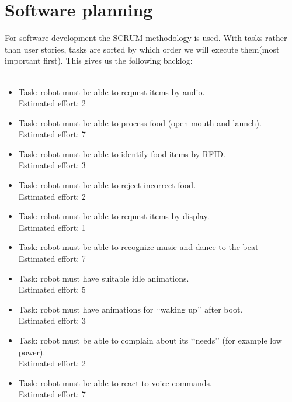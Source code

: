 \documentclass[11pt,twoside,a4paper]{report}
\begin{document}
\section{Software planning}
For software development the SCRUM methodology is used. With tasks rather than user stories,  tasks are sorted by which order we will execute them(most important first). This gives us the following backlog:\\
\\
\begin{itemize}
\item Task: robot must be able to request items by audio. \\
Estimated effort: 2 
\item Task: robot must be able to process food (open mouth and launch).\\
Estimated effort: 7  
\item Task: robot must be able to identify food items by RFID. \\
Estimated effort: 3 
\item Task: robot must be able to reject incorrect food.\\ 
Estimated effort: 2 
\item Task: robot must be able to request items by display.\\
Estimated effort: 1 
\item Task: robot must be able to recognize music and dance to the beat \\
Estimated effort:  7 
\item Task: robot must have suitable idle animations.\\ 
Estimated effort: 5
\item Task: robot must have animations for \lq\lq{}waking up\rq\rq{} after boot.\\ 
Estimated effort: 3 
\item Task: robot must be able to complain about its \lq\lq{}needs\rq\rq{} (for example low power).\\
Estimated effort: 2 
\item Task: robot must be able to react to voice commands.\\
Estimated effort: 7 
\end{itemize}
\end{document}
